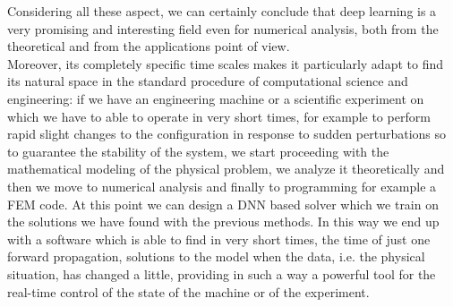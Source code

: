 \documentclass[12pt, a4paper]{report}
\theoremstyle{definition}
\begin{document}
Considering all these aspect, we can certainly conclude that deep learning is a very promising and interesting field even for numerical analysis, both from the theoretical and from the applications point of view.\\
Moreover, its completely specific time scales makes it particularly adapt to find its natural space in the standard procedure of computational science and engineering: if we have an engineering machine or a scientific experiment on which we have to able to operate in very short times, for example to perform rapid slight changes to the configuration in response to sudden perturbations so to guarantee the stability of the system, we start proceeding with the mathematical modeling of the physical problem, we analyze it theoretically and then we move to numerical analysis and finally to programming for example a FEM code. At this point we can design a DNN based solver which we train on the solutions we have found with the previous methods. In this way we end up with a software which is able to find in very short times, the time of just one forward propagation, solutions to the model when the data, i.e. the physical situation, has changed a little, providing in such a way a powerful tool for the real-time control of the state of the machine or of the experiment.




\appendix
\end{document}
